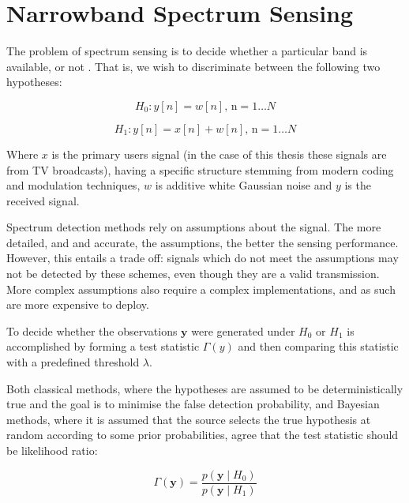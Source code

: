 \section{Narrowband Spectrum Sensing}

The problem of spectrum sensing is to decide whether a particular band is available, or not \cite{Yucek2009}. That is, we wish to discriminate between the following two hypotheses:

\begin{equation}
H_{0}: y\left[n\right] = w\left[n\right] \text{, n} =  1 \ldots N 
\end{equation}
\label{h1}

\begin{equation}
H_{1}: y\left[n \right] = x\left[n\right] + w\left[n\right] \text{, n} =  1 \ldots N 
\end{equation}
\label{h2}

Where \(x\) is the primary users signal (in the case of this thesis these signals are from TV broadcasts), having a specific structure stemming from modern coding and modulation techniques, \(w\) is additive white Gaussian noise and \(y\) is the received signal.

Spectrum detection methods rely on assumptions about the signal. The more detailed, and and accurate, the assumptions, the better the sensing performance. However, this entails a trade off: signals which do not meet the assumptions may not be detected by these schemes, even though they are a valid transmission. More complex assumptions also require a complex implementations, and as such are more expensive to deploy.

To decide whether the observations \(\textbf{y}\) were generated under \(\textit{H}_{0}\) or \(\textit{H}_{1}\) is accomplished by forming a test statistic \(\Gamma\left(y\right)\) and then comparing this statistic with a predefined threshold \(\lambda\). 

Both classical methods, where the hypotheses are assumed to be deterministically true and the goal is to minimise the false detection probability, and Bayesian methods, where it is assumed that the source selects the true hypothesis at random according to some prior probabilities, agree that the test statistic should be likelihood ratio:

\begin{equation}
\Gamma\left(\textbf{y}\right) = \frac{p\left(\textbf{y}\mid H_0\right)}{p\left(\textbf{y}\mid H_1\right)}
\end{equation}

